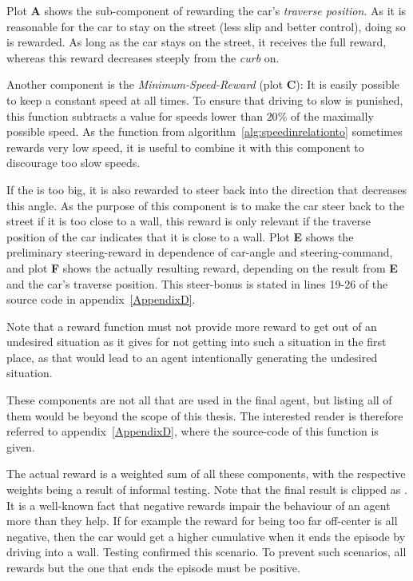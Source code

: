 Plot \textbf{A} shows the sub-component of rewarding the car's \textit{traverse position}. As it is reasonable for the car to stay on the street (less slip and better control), doing so is rewarded. As long as the car stays on the street, it receives the full reward, whereas this reward decreases steeply from the \textit{curb} on.

Another component is the \textit{Minimum-Speed-Reward} (plot \textbf{C}): It is easily possible to keep a constant speed at all times. To ensure that driving to slow is punished, this function subtracts a value for speeds lower than $20\%$ of the maximally possible speed. As the function from algorithm~\ref{alg:speedinrelationto} sometimes rewards very low speed, it is useful to combine it with this component to discourage too slow speeds.

If the  is too big, it is also rewarded to steer back into the direction that decreases this angle. As the purpose of this component is to make the car steer back to the street if it is too close to a wall, this reward is only relevant if the traverse position of the car indicates that it is close to a wall. Plot \textbf{E} shows the preliminary steering-reward in dependence of car-angle and steering-command, and plot \textbf{F} shows the actually resulting reward, depending on the result from \textbf{E} and the car's traverse position. This steer-bonus is stated in lines 19-26 of the source code in appendix~\ref{AppendixD}. 

Note that a reward function must not provide more reward to get out of an undesired situation as it gives for not getting into such a situation in the first place, as that would lead to an agent intentionally generating the undesired situation.

These components are not all that are used in the final agent, but listing all of them would be beyond the scope of this thesis. The interested reader is therefore referred to appendix~\ref{AppendixD}, where the source-code of this function is given.

The actual reward is a weighted sum of all these components, with the respective weights being a result of informal testing. Note that the final result is clipped as . It is a well-known fact that negative rewards impair the behaviour of an agent more than they help. If for example the reward for being too far off-center is all negative, then the car would get a higher cumulative when it ends the episode by driving into a wall. Testing confirmed this scenario. To prevent such scenarios, all rewards but the one that ends the episode must be positive.


